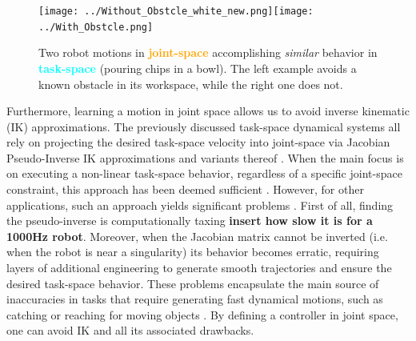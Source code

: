 \documentclass[letterpaper, 10 pt, conference,fleqn]{ieeeconf}
\begin{document}
\begin{figure}[t]
\centering
\texttt{[image: ../Without\_Obstcle\_white\_new.png]}\texttt{[image: ../With\_Obstcle.png]}
\caption{Two robot motions in \textcolor{orange}{\textbf{joint-space}} accomplishing \textit{similar} behavior in \textcolor{cyan}{\textbf{task-space}} (pouring chips in a bowl). The left example avoids a known obstacle in its workspace, while the right one does not.}
\label{fig:robot_example}
\vspace{-20pt}
\end{figure}

Furthermore, learning a motion in joint space allows us to avoid inverse kinematic (IK) approximations. The previously discussed task-space dynamical systems all rely on projecting the desired task-space velocity into joint-space via Jacobian Pseudo-Inverse IK approximations and variants thereof \cite{kelly2006control}. When the main focus is on executing a non-linear task-space behavior, regardless of a specific joint-space constraint, this approach has been deemed sufficient \cite{figueroa2016HRIrolling,ureche2015taskconst}. However, for other applications, such an approach yields significant problems \cite{buss2004introduction}. First of all, finding the pseudo-inverse is computationally taxing \textbf{insert how slow it is for a 1000Hz robot}. Moreover, when the Jacobian matrix cannot be inverted (i.e. when the robot is near a singularity) its behavior becomes erratic, requiring layers of additional engineering to generate smooth trajectories and ensure the desired task-space behavior. These problems encapsulate the main source of inaccuracies in tasks that require generating fast dynamical motions, such as catching or reaching for moving objects \cite{7439839,Salehian-RSS-16}. By defining a controller in joint space, one can avoid IK and all its associated drawbacks.
\end{document}
